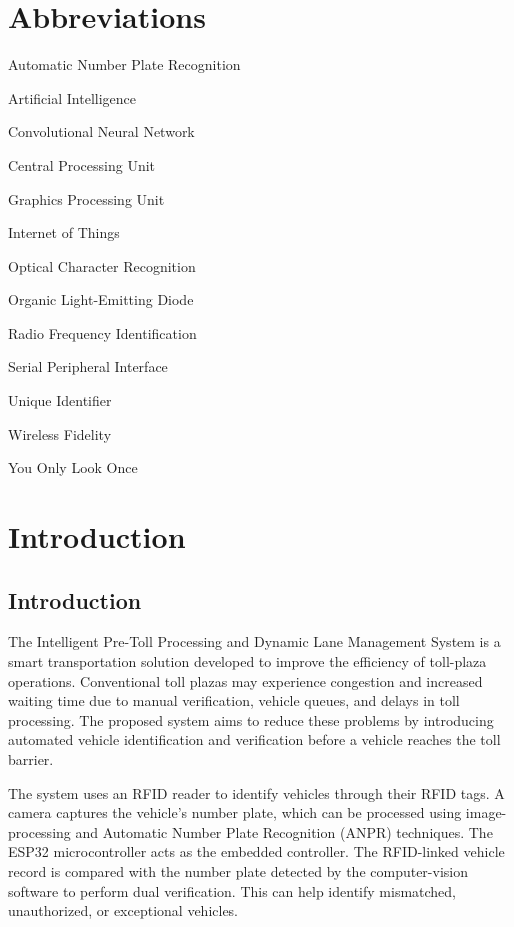 \documentclass[12pt,a4paper]{report}
\begin{document}
\chapter*{Abbreviations}
\begin{description}[style=nextline]
\item[ANPR] Automatic Number Plate Recognition
\item[AI] Artificial Intelligence
\item[CNN] Convolutional Neural Network
\item[CPU] Central Processing Unit
\item[GPU] Graphics Processing Unit
\item[IoT] Internet of Things
\item[OCR] Optical Character Recognition
\item[OLED] Organic Light-Emitting Diode
\item[RFID] Radio Frequency Identification
\item[SPI] Serial Peripheral Interface
\item[UID] Unique Identifier
\item[Wi-Fi] Wireless Fidelity
\item[YOLO] You Only Look Once
\end{description}

\clearpage
{}

\chapter{Introduction}
\section{Introduction}
The Intelligent Pre-Toll Processing and Dynamic Lane Management System is a smart
transportation solution developed to improve the efficiency of toll-plaza operations.
Conventional toll plazas may experience congestion and increased waiting time due to
manual verification, vehicle queues, and delays in toll processing. The proposed
system aims to reduce these problems by introducing automated vehicle identification
and verification before a vehicle reaches the toll barrier.

The system uses an RFID reader to identify vehicles through their RFID tags. A camera
captures the vehicle's number plate, which can be processed using image-processing
and Automatic Number Plate Recognition (ANPR) techniques. The ESP32 microcontroller
acts as the embedded controller. The RFID-linked vehicle record is compared with the
number plate detected by the computer-vision software to perform dual verification.
This can help identify mismatched, unauthorized, or exceptional vehicles.
\end{document}
